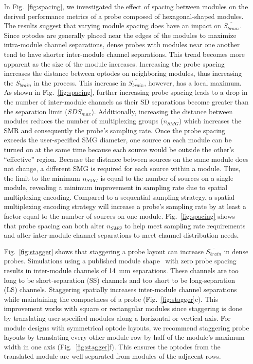 {%
In Fig.~\ref{fig:spacing}, we investigated the effect of spacing between modules on the derived performance metrics of a probe composed of hexagonal-shaped modules. The results suggest that varying module spacing does have an impact on $\overline{S_{brain}}$. Since optodes are generally placed near the edges of the modules to maximize intra-module channel separations, dense probes with modules near one another tend to have shorter inter-module channel separations. This trend becomes more apparent as the size of the module increases. Increasing the probe spacing increases the distance between optodes on neighboring modules, thus increasing the $\overline{S_{brain}}$ in the process. This increase in $\overline{S_{brain}}$, however, has a local maximum. As shown in Fig.~\ref{fig:spacing}, further increasing probe spacing leads to a drop in the number of inter-module channels as their \ac{SD} separations become greater than the separation limit ($SDS_{max}$). Additionally, increasing the distance between modules reduces the number of multiplexing groups ($n_{SMG}$) which increases the SMR and consequently the probe's sampling rate. Once the probe spacing exceeds the user-specified SMG diameter, one source on each module can be turned on at the same time because each source would be outside the other's ``effective'' region. Because the distance between sources on the same module does not change, a different SMG is required for each source within a module. Thus, the limit to the minimum $n_{SMG}$ is equal to the number of sources on a single module, revealing a minimum improvement in sampling rate due to spatial multiplexing encoding. Compared to a sequential sampling strategy, a spatial multiplexing encoding strategy will increase a probe's sampling rate by at least a factor equal to the number of sources on one module. Fig.~\ref{fig:spacing} shows that probe spacing can both alter $n_{SMG}$ to help meet sampling rate requirements and alter inter-module channel separations to meet channel distribution needs.

Fig.~\ref{fig:stagger} shows that staggering a probe layout can increase $\overline{S_{brain}}$ in dense probes. Simulations using a published module shape~\cite{Bci2017} with zero probe spacing results in inter-module channels of 14~mm separations. These channels are too long to be short-separation (SS) channels and too short to be long-separation (LS) channels. Staggering spatially increases inter-module channel separations while maintaining the compactness of a probe (Fig.~\ref{fig:stagger}c). This improvement works with square or rectangular modules since staggering is done by translating user-specified modules along a horizontal or vertical axis. For module designs with symmetrical optode layouts, we recommend staggering probe layouts by translating every other module row by half of the module's maximum width in one axis (Fig.~\ref{fig:stagger}f). This ensures the optodes from the translated module are well separated from modules of the adjacent rows.

}
